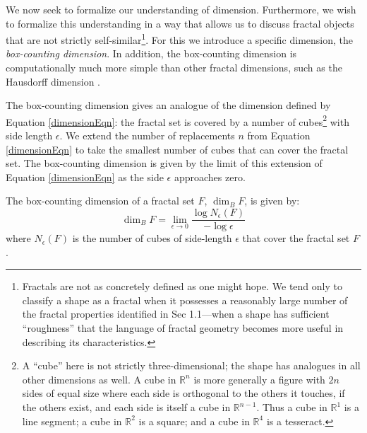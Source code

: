 We now seek to formalize our understanding of dimension. Furthermore, we wish to formalize this understanding in a way that allows us to discuss fractal objects that are not strictly self-similar\footnote{Fractals are not as concretely defined as one might hope. We tend only to classify a shape as a fractal when it possesses a reasonably large number of the fractal properties identified in Sec 1.1---when a shape has sufficient ``roughness'' that the language of fractal geometry becomes more useful in describing its characteristics.}. For this we introduce a specific dimension, the \textit{box-counting dimension}. In addition, the box-counting dimension is computationally much more simple than other fractal dimensions, such as the Hausdorff dimension \citep{fractaltextbook}.

The box-counting dimension gives an analogue of the dimension defined by Equation \ref{dimensionEqn}: the fractal set is covered by a number of cubes\footnote{A ``cube'' here is not strictly three-dimensional; the shape has analogues in all other dimensions as well. A cube in $\mathbb{R}^n$ is more generally a figure with $2n$ sides of equal size where each side is orthogonal to the others it touches, if the others exist, and each side is itself a cube in $\mathbb{R}^{n-1}$. Thus a cube in $\mathbb{R}^1$ is a line segment; a cube in $\mathbb{R}^2$ is a square; and a cube in $\mathbb{R}^4$ is a tesseract.} with side length $\epsilon$. We extend the number of replacements $ n $ from Equation \ref{dimensionEqn} to take the smallest number of cubes that can cover the fractal set. The box-counting dimension is given by the limit of this extension of Equation \ref{dimensionEqn} as the side $\epsilon$ approaches zero.

\begin{mydef} The box-counting dimension of a fractal set $ F $, $\operatorname{dim}_B F $, is given by:
\begin{equation}\label{boxcountingeqn}\operatorname{dim}_B F = \lim_{\epsilon \to 0} \frac{\log N_\epsilon(F)}{-\log\epsilon}
\end{equation}
where $N_\epsilon(F)$ is the number of cubes of side-length $\epsilon$ that cover the fractal set $F$.
\end{mydef}

